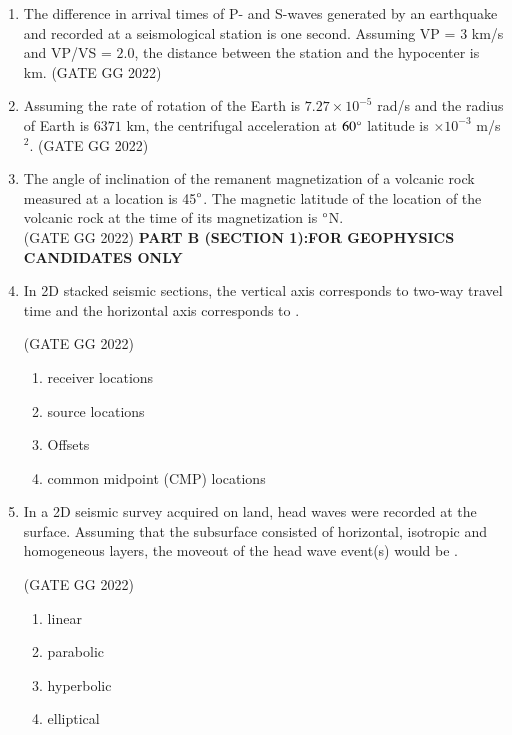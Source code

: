\documentclass[journal]{IEEEtran}
\begin{document}
\begin{enumerate}
\item The difference in arrival times of P- and S-waves generated by an earthquake and recorded at a seismological station is one second. Assuming VP = $3$ km/s and VP/VS = $2.0$, the distance between the station and the hypocenter is \makebox[2cm]{\hrulefill} km. 
\hfill(GATE GG 2022)
\vspace{0.5cm}

\item Assuming the rate of rotation of the Earth is $7.27 \times 10^{-5}$ rad/s and the radius of Earth is $6371$ km, the centrifugal acceleration at $60\degree$ latitude is  \makebox[2cm]{\hrulefill}$\times 10^{-3}$ m/s$^2$. 
\hfill(GATE GG 2022)
\vspace{0.5cm}

\item The angle of inclination of the remanent magnetization of a volcanic rock measured at a location is 45$\degree$. The magnetic latitude of the location of the volcanic rock at the time of its magnetization is  \makebox[2cm]{\hrulefill}$\degree$N. \\
\hspace*{15.7cm}(GATE GG 2022)
\textbf{PART B (SECTION 1):FOR GEOPHYSICS CANDIDATES ONLY}
\vspace{0.5cm}

\item In 2D stacked seismic sections, the vertical axis corresponds to two-way travel time and the horizontal axis corresponds to\makebox[2cm]{\hrulefill} . 

\hfill(GATE GG 2022)
\begin{enumerate}
\item receiver locations  
\item source locations  
\item Offsets  
\item common midpoint (CMP) locations  
\end{enumerate}

\item In a 2D seismic survey acquired on land, head waves were recorded at the surface. Assuming that the subsurface consisted of horizontal, isotropic and homogeneous layers, the moveout of the head wave event(s) would be  \makebox[2cm]{\hrulefill} . 

\hfill(GATE GG 2022)
\begin{enumerate}
\item linear  
\item parabolic  
\item hyperbolic  
\item elliptical  
\end{enumerate}



\end{enumerate}
\end{document}
